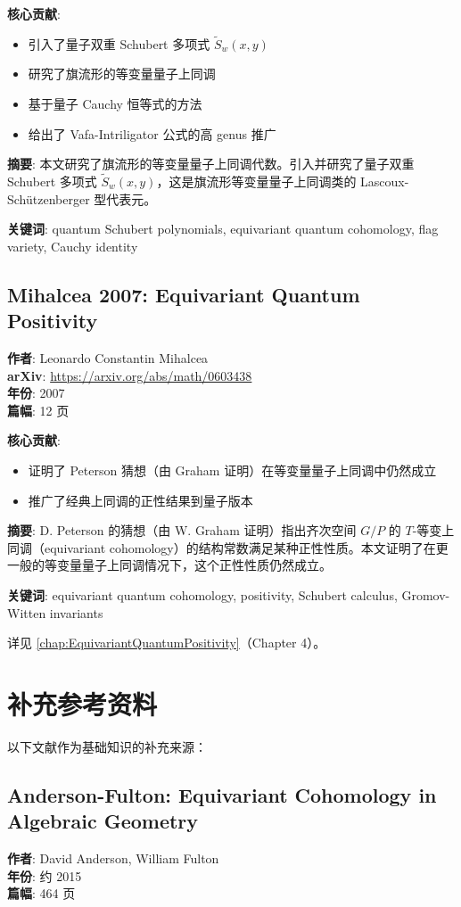 \textbf{核心贡献}:
\begin{itemize}
\item 引入了量子双重 Schubert 多项式 $\tilde{S}_w(x, y)$
\item 研究了旗流形的等变量量子上同调
\item 基于量子 Cauchy 恒等式的方法
\item 给出了 Vafa-Intriligator 公式的高 genus 推广
\end{itemize}

\textbf{摘要}: 本文研究了旗流形的等变量量子上同调代数。引入并研究了量子双重 Schubert 多项式 $\tilde{S}_w(x, y)$，这是旗流形等变量量子上同调类的 Lascoux-Schützenberger 型代表元。

\textbf{关键词}: quantum Schubert polynomials, equivariant quantum cohomology, flag variety, Cauchy identity

\subsection{Mihalcea 2007: Equivariant Quantum Positivity}
\textbf{作者}: Leonardo Constantin Mihalcea \cite{Mihalcea} \\
\textbf{arXiv}: \url{https://arxiv.org/abs/math/0603438} \\
\textbf{年份}: 2007 \\
\textbf{篇幅}: 12 页

\textbf{核心贡献}:
\begin{itemize}
\item 证明了 Peterson 猜想（由 Graham 证明）在等变量量子上同调中仍然成立
\item 推广了经典上同调的正性结果到量子版本
\end{itemize}

\textbf{摘要}: D. Peterson 的猜想（由 W. Graham 证明）指出齐次空间 $G/P$ 的 $T$-等变上同调（equivariant cohomology）的结构常数满足某种正性性质。本文证明了在更一般的等变量量子上同调情况下，这个正性性质仍然成立。

\textbf{关键词}: equivariant quantum cohomology, positivity, Schubert calculus, Gromov-Witten invariants

详见 \cref{chap:EquivariantQuantumPositivity}（Chapter 4）。

\section{补充参考资料}

以下文献作为基础知识的补充来源：

\subsection{Anderson-Fulton: Equivariant Cohomology in Algebraic Geometry}
\textbf{作者}: David Anderson, William Fulton \\
\textbf{年份}: 约 2015 \\
\textbf{篇幅}: 464 页


